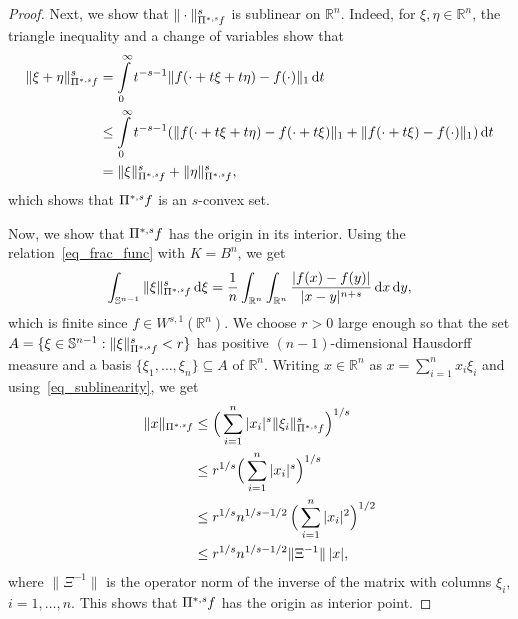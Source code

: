 \documentclass{amsart}
\newcommand{\ofpp}[1]{\operatorname{\Pi^{\ast,{\it #1}}}\!}
\newcommand{\Bvtex}{{B^n}}
\newcommand{\snvtex}{{\mathbb S}^{n-1}}
\newcommand{\dvtex}{\,\mathrm{d}}
\begin{document}
\begin{proof}
Next, we show that $\Vert \cdot \Vert _{\ofpp{s}f}^{s}$ is sublinear on
$\mathbb R^{n}$. Indeed, for $\xi , \eta \in \mathbb R^{n}$, the triangle
inequality and a change of variables show that
%
\begin{equation}
%
\begin{split} \Vert \xi +\eta \Vert _{\ofpp{s} f}^{s}
&= \int \limits _{0}^{\infty }t^{-s-1} \|f(\cdot +t\xi +t\eta )-f(
\cdot )\|_{1} \dvtex t
\\
&\leq \int \limits _{0}^{\infty }t^{-s-1} ( \|f(\cdot +t\xi +t\eta )-f(
\cdot +t\xi )\|_{1} + \|f(\cdot +t\xi )-f(\cdot )\|_{1} ) \dvtex t
\label{eq_sublinearity}
\\
&= \|\xi \|_{\ofpp{s} f}^{s}+ \|\eta \|_{\ofpp{s} f}^{s},
\end{split}
%
\end{equation}
%
which shows that $\ofpp{s} f$ is an $s$-convex set.

Now, we show that $\ofpp{s} f$ has the origin in its interior. Using the
relation~\eqref{eq_frac_func} with $K=\Bvtex $, we get
%
\begin{equation}
\int _{\snvtex} \Vert \xi \Vert _{\ofpp{s}f}^{s} \dvtex \xi = \frac {1}{n}
\int _{\mathbb R^{n}}\int _{\mathbb R^{n}}
\frac{|f(x)-f(y)|}{|x-y|^{n+s}} \dvtex x \dvtex y,
\nonumber \end{equation}
%
which is finite since $f\in W^{s,1}(\mathbb R^{n})$. We choose $r>0$ large
enough so that the set
$A = \{\xi \in \snvtex : \Vert \xi \Vert _{\ofpp{s}f}^{s} < r\}$ has positive
$(n-1)$-dimensional Hausdorff measure and a basis
$\{\xi _{1}, \ldots , \xi _{n}\} \subseteq A$ of $\mathbb R^{n}$. Writing
$x \in \mathbb R^{n}$ as $x = \sum _{i=1}^{n} x_{i} \xi _{i}$ and using~\eqref{eq_sublinearity}, we get
%
\begin{equation}
\label{eq_bounded}
%
\begin{split} \|x\|_{\ofpp sf} &\leq \Big( \sum _{i=1}^{n} |x_{i}|^{s}
\|\xi _{i}\|_{\ofpp sf}^{s} \Big)^{1/s}
\\
&\leq r^{1/s} \Big( \sum _{i=1}^{n} |x_{i}|^{s} \Big)^{1/s}
\\
&\leq r^{1/s} n^{1/s-1/2}\, \Big( \sum _{i=1}^{n} |x_{i}|^{2} \Big)^{1/2}
\\
&\leq r^{1/s} n^{1/s-1/2} \|\Xi ^{-1}\| \, |x|,
\end{split}
%
\end{equation}
%
where $\|\Xi ^{-1}\|$ is the operator norm of the inverse of the matrix
with columns $\xi _{i}$, $i=1, \ldots , n$. This shows that
$\ofpp sf$ has the origin as interior point.


\end{proof}
\end{document}
